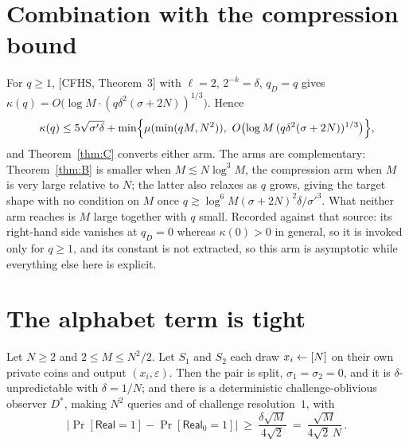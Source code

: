 \documentclass{aicr-solution}
\newcommand{\Real}{\mathsf{Real}}
\newcommand{\Prob}[1]{\Pr\!\left[#1\right]}
\begin{document}
\section{Combination with the compression bound}

For $q\ge1$, [CFHS, Theorem~3] with $\ell=2$, $2^{-k}=\delta$, $q_D=q$ gives
$\kappa(q)=O\bigl(\log M\cdot(q\delta^{2}(\sigma+2N))^{1/3}\bigr)$. Hence
\[
  \kappa(q)\le5\sqrt{\sigma'\delta}+\min\Bigl\{\mu(\min(qM,N^{2})),\
  O\bigl(\log M\,(q\delta^{2}(\sigma+2N))^{1/3}\bigr)\Bigr\},
\]
and Theorem~\ref{thm:C} converts either arm. The arms are complementary:
Theorem~\ref{thm:B} is smaller when $M\lesssim N\log^{3}M$, the compression arm
when $M$ is very large relative to $N$; the latter also relaxes as $q$ grows,
giving the target shape with no condition on $M$ once
$q\gtrsim\log^{6}M(\sigma+2N)^{2}\delta/\sigma'^{3}$. What neither arm reaches is
$M$ large together with $q$ small. Recorded against that source: its right-hand
side vanishes at $q_D=0$ whereas $\kappa(0)>0$ in general, so it is invoked only
for $q\ge1$, and its constant is not extracted, so this arm is asymptotic while
everything else here is explicit.

\section{The alphabet term is tight}\label{sec:tight}

\begin{proposition}\label{prop:F}
Let $N\ge2$ and $2\le M\le N^{2}/2$. Let $S_1$ and $S_2$ each draw
$x_i\leftarrow[N]$ on their own private coins and output $(x_i,\varepsilon)$. Then the
pair is split, $\sigma_1=\sigma_2=0$, and it is $\delta$-unpredictable with
$\delta=1/N$; and there is a deterministic challenge-oblivious observer $D^{*}$,
making $N^{2}$ queries and of challenge resolution~$1$, with
\[
  \bigl|\Prob{\Real=1}-\Prob{\Real_0=1}\bigr|\ \ge\ \frac{\delta\sqrt M}{4\sqrt2}
  \ =\ \frac{\sqrt M}{4\sqrt2\,N}\,.
\]
\end{proposition}
\end{document}
